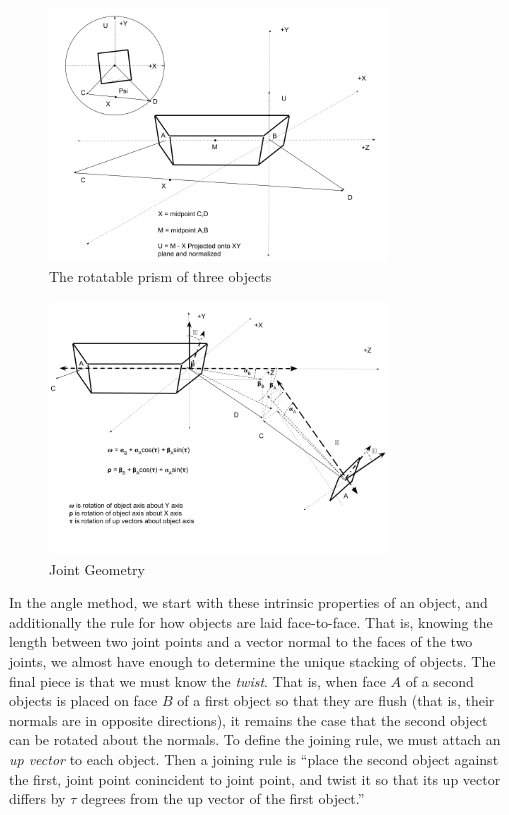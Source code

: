\documentclass[11pt]{article}
\begin{document}
{\begin{figure}
     \centering
     \includegraphics[width=0.80\textwidth]{figures/ObjectForStackingSetup.png}
     \caption{The rotatable prism of three objects}
  \label{fig:intrinsicdiagram}
\end{figure}

\begin{figure}
     \centering
     \includegraphics[width=0.80\textwidth]{figures/JointGeometry.png}
     \caption{Joint Geometry}
  \label{fig:jointdiagram}
\end{figure}


In the angle method, we start with these intrinsic properties of an object, and additionally the
rule for how objects are laid face-to-face. That is, knowing the length between two
joint points and a vector normal to the faces of the two joints, we almost have
enough to determine the unique stacking of objects. The final piece is that we must
know the {\em twist}. That is, when face $A$ of a second objects is placed on face $B$
of a first object so that they are flush (that is, their normals are in opposite directions),
it remains the case that the second object can be rotated about the normals. To
define the joining rule, we must attach an {\em up vector} to each object. Then a joining
rule is ``place the second object against the first, joint point conincident to joint point,
and twist it so that its up vector differs by $\tau$ degrees from the up vector of the first
object.''

}
\end{document}
